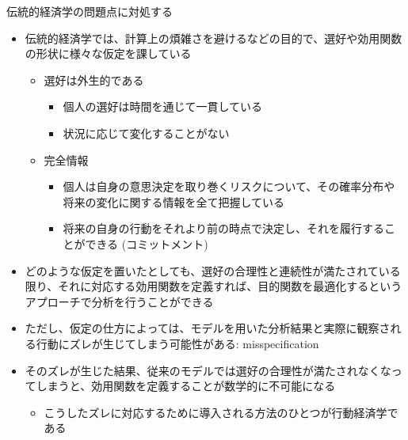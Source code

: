 \documentclass[dvipdfmx,11pt]{beamer}
\begin{document}
\begin{frame}{伝統的経済学の問題点に対処する}
  \begin{itemize}
    \item 伝統的経済学では、計算上の煩雑さを避けるなどの目的で、選好や効用関数の形状に様々な仮定を課している
    \begin{itemize}
      \item 選好は外生的である
      \begin{itemize}
        \item 個人の選好は時間を通じて一貫している
        \item 状況に応じて変化することがない
      \end{itemize}
      \item 完全情報
      \begin{itemize}
        \item 個人は自身の意思決定を取り巻くリスクについて、その確率分布や将来の変化に関する情報を全て把握している
        \item 将来の自身の行動をそれより前の時点で決定し、それを履行することができる (コミットメント)
      \end{itemize}
    \end{itemize}
  \end{itemize}
\end{frame}

\begin{frame}{}
  \begin{itemize}
    \item どのような仮定を置いたとしても、選好の合理性と連続性が満たされている限り、それに対応する効用関数を定義すれば、目的関数を最適化するというアプローチで分析を行うことができる
    \item ただし、仮定の仕方によっては、モデルを用いた分析結果と実際に観察される行動にズレが生じてしまう可能性がある: misspecification
    \item そのズレが生じた結果、従来のモデルでは選好の合理性が満たされなくなってしまうと、効用関数を定義することが数学的に不可能になる
    \begin{itemize}
      \item こうしたズレに対応するために導入される方法のひとつが行動経済学である
    \end{itemize}
  \end{itemize}
\end{frame}
\end{document}
